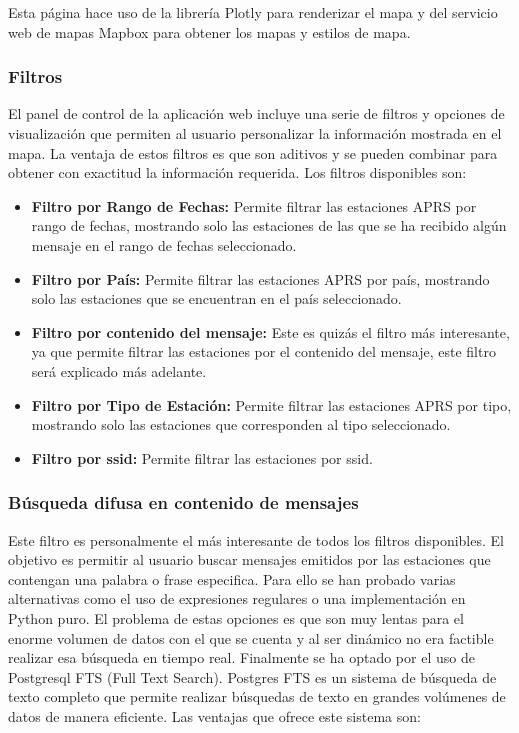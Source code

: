 Esta página hace uso de la librería Plotly para renderizar el mapa y del servicio web de mapas Mapbox para obtener los mapas y estilos de mapa.

\subsubsection{Filtros}
El panel de control de la aplicación web incluye una serie de filtros y opciones de visualización que permiten al usuario personalizar la información mostrada en el mapa. La ventaja de estos filtros es que son aditivos y se pueden combinar para obtener con exactitud la información requerida. Los filtros disponibles son:
\begin{itemize}
	\item \textbf{Filtro por Rango de Fechas:} Permite filtrar las estaciones APRS por rango de fechas, mostrando solo las estaciones de las que se ha recibido algún mensaje en el rango de fechas seleccionado.
	\item \textbf{Filtro por País:} Permite filtrar las estaciones APRS por país, mostrando solo las estaciones que se encuentran en el país seleccionado.
	\item \textbf{Filtro por contenido del mensaje:} Este es quizás el filtro más interesante, ya que permite filtrar las estaciones por el contenido del mensaje, este filtro será explicado más adelante.
	\item \textbf{Filtro por Tipo de Estación:} Permite filtrar las estaciones APRS por tipo, mostrando solo las estaciones que corresponden al tipo seleccionado.
	\item \textbf{Filtro por ssid:} Permite filtrar las estaciones por ssid.
\end{itemize}

\subsubsection{Búsqueda difusa en contenido de mensajes}
Este filtro es personalmente el más interesante de todos los filtros disponibles. El objetivo es permitir al usuario buscar mensajes emitidos por las estaciones que contengan una palabra o frase especifica. Para ello se han probado varias alternativas como el uso de expresiones regulares o una implementación en Python puro. El problema de estas opciones es que son muy lentas para el enorme volumen de datos con el que se cuenta y al ser dinámico no era factible realizar esa búsqueda en tiempo real.
Finalmente se ha optado por el uso de Postgresql FTS (Full Text Search). Postgres FTS es un sistema de búsqueda de texto completo que permite realizar búsquedas de texto en grandes volúmenes de datos de manera eficiente. Las ventajas que ofrece este sistema son:

